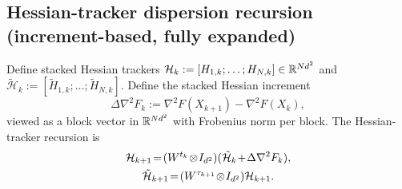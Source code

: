 \documentclass[review,onefignum,onetabnum]{siamart171218}
\begin{document}
	\subsection{Hessian-tracker dispersion recursion (increment-based, fully expanded)}
	
	Define stacked Hessian trackers $\mathcal H_k:=[H_{1,k};\dots;H_{N,k}]\in\mathbb{R}^{Nd^2}$ and
	$\tilde{\mathcal H}_k:=[\tilde H_{1,k};\dots;\tilde H_{N,k}]$.
	Define the stacked Hessian increment
	\[
	\Delta\nabla^2 F_k:=\nabla^2 F(X_{k+1})-\nabla^2 F(X_k),
	\]
	viewed as a block vector in $\mathbb{R}^{Nd^2}$ with Frobenius norm per block.
	The Hessian-tracker recursion is
	\begin{gather}
		\mathcal H_{k+1}\!=\!(W^{t_k}\!\otimes\! I_{d^2})(\tilde{\mathcal H}_k\!+\!\Delta\nabla^2 F_k),\label{eq:H_update_stack}\\
		\tilde{\mathcal H}_{k+1}\!=\!(W^{\tau_{k+1}}\!\otimes\! I_{d^2})\mathcal H_{k+1}.\notag
	\end{gather}
	
\end{document}

